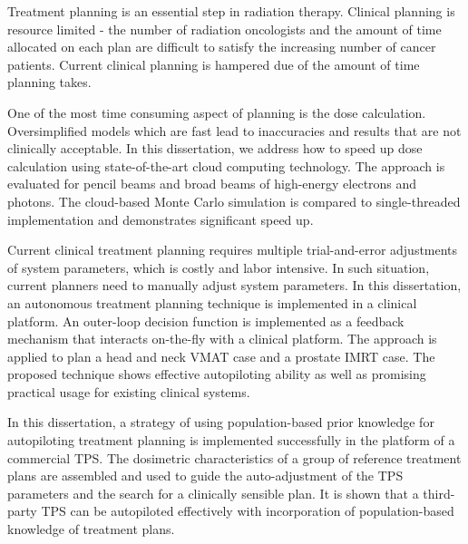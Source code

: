 
Treatment planning is an essential step in radiation therapy. Clinical planning is resource limited - the number of radiation oncologists and the amount of time allocated on each plan are difficult to satisfy the increasing number of cancer patients. Current clinical planning is hampered due of the amount of time planning takes. 

One of the most time consuming aspect of planning is the dose calculation. Oversimplified models which are fast lead to inaccuracies and results that are not clinically acceptable. In this dissertation, we address how to speed up dose calculation using state-of-the-art cloud computing technology. The approach is evaluated for pencil beams and broad beams of high-energy electrons and photons. The cloud-based Monte Carlo simulation is compared to single-threaded implementation and demonstrates significant speed up. 

Current clinical treatment planning requires multiple trial-and-error adjustments of system parameters, which is costly and labor intensive. In such situation, current planners need to manually adjust system parameters.  In this dissertation, an autonomous treatment planning technique is implemented in a clinical platform. An outer-loop decision function is implemented as a feedback mechanism that interacts on-the-fly with a clinical platform.  The approach is applied to plan a head and neck VMAT case and a prostate IMRT case. The proposed technique shows effective autopiloting ability as well as promising practical usage for existing clinical systems.

In this dissertation, a strategy of using population-based prior knowledge for autopiloting treatment planning is implemented successfully in the platform of a commercial TPS. The dosimetric characteristics of a group of reference treatment plans are assembled and used to guide the auto-adjustment of the TPS parameters and the search for a clinically sensible plan. It is shown that a third-party TPS can be autopiloted effectively with incorporation of population-based knowledge of treatment plans.
